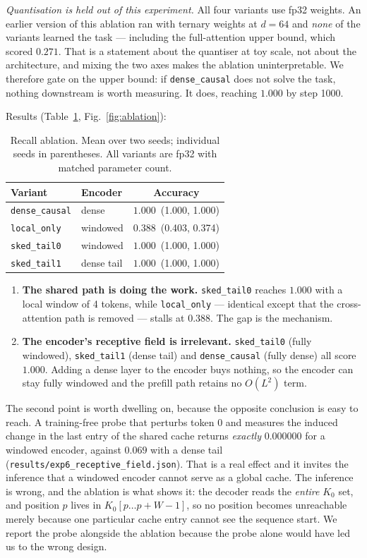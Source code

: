 \documentclass[10pt,conference]{IEEEtran}
\newcommand{\code}[1]{\texttt{\small #1}}
\begin{document}
\emph{Quantisation is held out of this experiment.} All four variants use fp32 weights.
An earlier version of this ablation ran with ternary weights at $d=64$ and
\emph{none} of the variants learned the task --- including the full-attention upper
bound, which scored $0.271$. That is a statement about the quantiser at toy scale, not
about the architecture, and mixing the two axes makes the ablation uninterpretable. We
therefore gate on the upper bound: if \code{dense\_causal} does not solve the task,
nothing downstream is worth measuring. It does, reaching $1.000$ by step 1000.

Results (Table~\ref{tab:ablation}, Fig.~\ref{fig:ablation}):

\begin{table}[t]
\centering
\caption{Recall ablation. Mean over two seeds; individual seeds in parentheses.
All variants are fp32 with matched parameter count.}
\label{tab:ablation}
\small
\begin{tabular}{@{}llc@{}}
\toprule
Variant & Encoder & Accuracy \\
\midrule
\code{dense\_causal} & dense & $1.000$ \,(1.000, 1.000) \\
\code{local\_only}   & windowed & $0.388$ \,(0.403, 0.374) \\
\code{sked\_tail0}   & windowed & $1.000$ \,(1.000, 1.000) \\
\code{sked\_tail1}   & dense tail & $1.000$ \,(1.000, 1.000) \\
\bottomrule
\end{tabular}
\end{table}

\begin{enumerate}
\item \textbf{The shared path is doing the work.} \code{sked\_tail0} reaches $1.000$
with a local window of 4 tokens, while \code{local\_only} --- identical except that the
cross-attention path is removed --- stalls at $0.388$. The gap is the mechanism.
\item \textbf{The encoder's receptive field is irrelevant.} \code{sked\_tail0} (fully
windowed), \code{sked\_tail1} (dense tail) and \code{dense\_causal} (fully dense) all
score $1.000$. Adding a dense layer to the encoder buys nothing, so the encoder can
stay fully windowed and the prefill path retains no $O(L^2)$ term.
\end{enumerate}

The second point is worth dwelling on, because the opposite conclusion is easy to
reach. A training-free probe that perturbs token 0 and measures the induced change in
the last entry of the shared cache returns \emph{exactly} $0.000000$ for a windowed
encoder, against $0.069$ with a dense tail
(\code{results/exp6\_receptive\_field.json}). That is a real effect and it invites the
inference that a windowed encoder cannot serve as a global cache. The inference is
wrong, and the ablation is what shows it: the decoder reads the \emph{entire} $K_0$
set, and position $p$ lives in $K_0[p \dots p+W-1]$, so no position becomes
unreachable merely because one particular cache entry cannot see the sequence start.
We report the probe alongside the ablation because the probe alone would have led us
to the wrong design.
\end{document}
